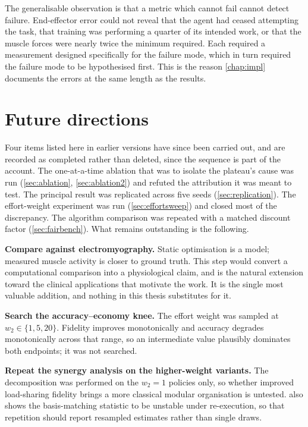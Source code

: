 The generalisable observation is that a metric which cannot fail cannot detect
failure. End-effector error could not reveal that the agent had ceased attempting
the task, that training was performing a quarter of its intended work, or that
the muscle forces were nearly twice the minimum required. Each required a measurement designed
specifically for the failure mode, which in turn required the failure mode to be
hypothesised first. This is the reason \cref{chap:impl} documents the errors
at the same length as the results.

\section{Future directions}
\label{sec:future}

Four items listed here in earlier versions have since been carried out, and are
recorded as completed rather than deleted, since the sequence is part of the
account. The one-at-a-time ablation that was to isolate the plateau's cause was
run (\cref{sec:ablation}, \cref{sec:ablation2}) and refuted the attribution it
was meant to test. The principal result was replicated across five seeds
(\cref{sec:replication}). The effort-weight experiment was run
(\cref{sec:effortsweep}) and closed most of the discrepancy. The algorithm
comparison was repeated with a matched discount factor
(\cref{sec:fairbench}). What remains outstanding is the following.

\textbf{Compare against electromyography.} Static optimisation is a model;
measured muscle activity is closer to ground truth. This step would convert a
computational comparison into a physiological claim, and is the natural extension
toward the clinical applications that motivate the work. It is the single most
valuable addition, and nothing in this thesis substitutes for it.

\textbf{Search the accuracy--economy knee.} The effort weight was sampled at
$w_2 \in \{1, 5, 20\}$. Fidelity improves monotonically and accuracy degrades
monotonically across that range, so an intermediate value plausibly dominates
both endpoints; it was not searched.

\textbf{Repeat the synergy analysis on the higher-weight variants.} The
decomposition was performed on the $w_2 = 1$ policies only, so whether improved
load-sharing fidelity brings a more classical modular organisation is untested.
 also shows the basis-matching statistic to be unstable
under re-execution, so that repetition should report resampled estimates rather
than single draws.

